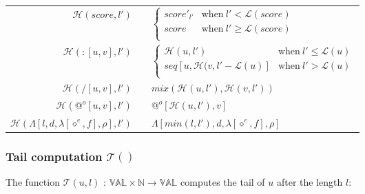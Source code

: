\documentclass[10pt,a4paper,frenchb]{article}
\makeatletter
\newcommand{\seq}{:}
\newcommand{\var}[1]{\diamond^#1}
\newcommand{\val}{\mathbb{VAL}}
\newcommand{\closure}{\Lambda}
\newcommand{\noredex}{@^o}
\newcommand{\f}[3]{$#1 \times #2 \rightarrow #3$}
\newcommand{\envsym}{\rho}
\newcommand{\closenv}[4][\var{e}]{\closure[#3,#4,\lambda[#1,#2],\envsym]}
\newcommand{\length}	{{\mathcal L}}
\newcommand{\head}		{{\mathcal H}}
\newcommand{\tail}		{{\mathcal T}}
\makeatother
\begin{document}
\begin{center}
\begin{tabular*}{12cm}{rc@{ $\rightarrow$ }l}
 \hline
 $\head(score,l')$				& & $\left\{ \begin{array}{ll}
 								score'_{l'} & \mathrm{when} \  l' < \length(score) \\
								score & \mathrm{when} \  l' \geq \length(score) \\
	 							\end{array} \right.$ \\
 $\head(\seq [u,v],l')$		& & $\left\{ \begin{array}{ll}
 								\head(u,l') & \mathrm{when} \  l' \leq \length(u) \\
								seq[u, \head(v, l'-\length(u)] & \mathrm{when} \  l' > \length(u) \\
	 							\end{array} \right.$ \\
 $\head(/ [u,v],l')$ 			& & $mix(\head(u, l'), \head(v, l'))$ \\
 $\head(\noredex [u,v],l')$ 	& & $\noredex[\head(u,l'),v]$ \\
 $\head(\closenv{f}{l}{d},l')$ 	& &  $\closenv{f}{min(l,l')}{d}$ \\
 \hline
\end{tabular*}
\end{center}

\subsubsection{Tail computation $\tail()$}
The function $\tail(u,l)$ :  \f{\val}{\mathbb{N}}{\val} computes the tail of $u$ after the length $l$:
\end{document}
